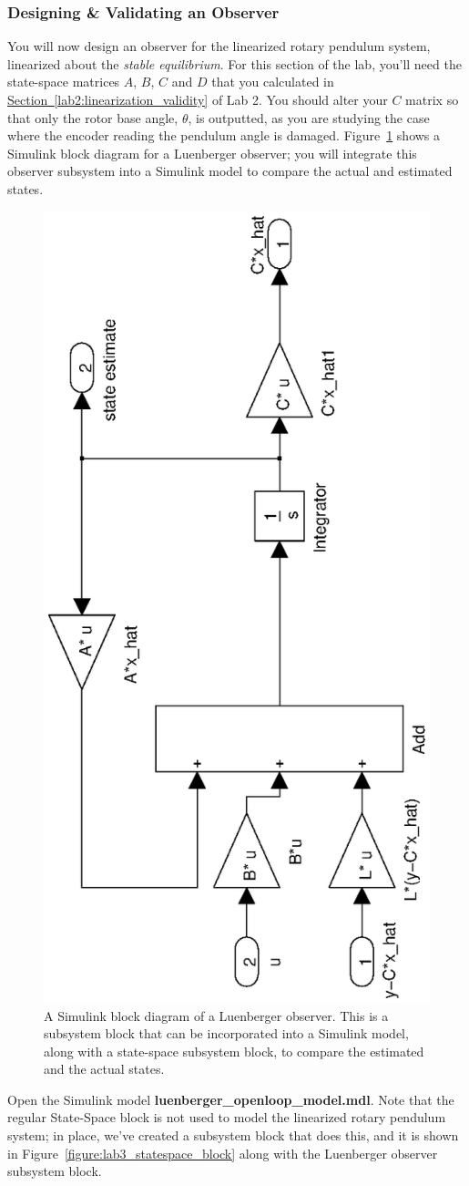 \documentclass[12pt]{report}
\begin{document}
\subsubsection{Designing \& Validating an Observer}\label{sub subsection:lab3_observer_design}
You will now design an observer for the linearized rotary pendulum system, linearized about the \emph{stable equilibrium}. For this section of the lab, you'll need the state-space matrices $A$, $B$, $C$ and $D$ that you calculated in \hyperref[lab2:linearization_validity]{Section~\ref{lab2:linearization_validity}} of Lab 2. You should alter your $C$ matrix so that only the rotor base angle, $\theta$, is outputted, as you are studying the case where the encoder reading the pendulum angle is damaged. Figure~\ref{figure:lab3_luenberger_block} shows a Simulink block diagram for a Luenberger observer; you will integrate this observer subsystem into a Simulink model to compare the actual and estimated states.
\begin{figure}[htb!]
    \centering
    \includegraphics[width=0.4\linewidth,angle=-90]{eps/lab_3/luenberger_subsystem}
    \caption{A Simulink block diagram of a Luenberger observer. This is a subsystem block that can be incorporated into a Simulink model, along with a state-space subsystem block, to compare the estimated and the actual states.}
    \label{figure:lab3_luenberger_block}
\end{figure}
\newpage
Open the Simulink model \textbf{luenberger\_openloop\_model.mdl}. Note that the regular State-Space block is not used to model the linearized rotary pendulum system; in place, we've created a subsystem block that does this, and it is shown in Figure~\ref{figure:lab3_statespace_block} along with the Luenberger observer subsystem block.
\end{document}
